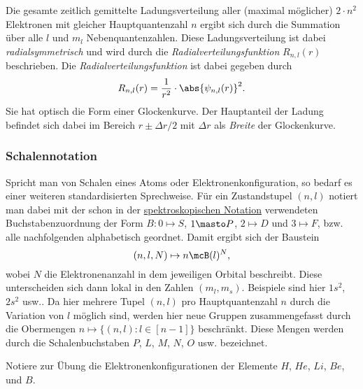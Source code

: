 \documentclass{subfiles}
\begin{document}
        Die gesamte zeitlich gemittelte Ladungsverteilung aller (maximal möglicher) $2\cdot n^2$ Elektronen mit gleicher Hauptquantenzahl $n$ ergibt sich durch die Summation über alle $l$ und $m_l$ Nebenquantenzahlen. Diese Ladungsverteilung ist dabei \emph{radialsymmetrisch} und wird durch die \emph{Radialverteilungsfunktion} $R_{n,l}(r)$ beschrieben. Die \emph{Radialverteilungsfunktion} ist dabei gegeben durch
        \[
            R_{n,l}(r) = \frac{1}{r^2}\cdot\abs{\psi_{n,l}(r)}^2.
        \]
        Sie hat optisch die Form einer Glockenkurve. Der Hauptanteil der Ladung befindet sich dabei im Bereich $r\pm \Delta r/2$ mit $\Delta r$ als \emph{Breite} der Glockenkurve. 

        \subsubsection*{Schalennotation}\label{not:SchalenNot}
            Spricht man von Schalen eines Atoms oder Elektronenkonfiguration, so bedarf es einer weiteren standardisierten Sprechweise. Für ein Zustandstupel $(n,l)$ notiert man dabei mit der schon in der \hyperref[not:SpektNot]{spektroskopischen Notation} verwendeten Buchstabenzuordnung der Form $B:0\mapsto S$, $1\masto P$, $2\mapsto D$ und $3\mapsto F$, bzw. alle nachfolgenden alphabetisch geordnet. Damit ergibt sich der Baustein
            \[
                (n,l,N)\mapsto n\mcB(l)^N,
            \]
            wobei $N$ die Elektronenanzahl in dem jeweiligen Orbital beschreibt. Diese unterscheiden sich dann lokal in den Zahlen $(m_l,m_s)$. Beispiele sind hier $1s^2$, $2s^2$ usw.. Da hier mehrere Tupel $(n,l)$ pro Hauptquantenzahl $n$ durch die Variation von $l$ möglich sind, werden hier neue Gruppen zusammengefasst durch die Obermengen $n\mapsto\{(n,l):l\in[n-1]\}$ beschränkt. Diese Mengen werden durch die Schalenbuchstaben $P$, $L$, $M$, $N$, $O$ usw. bezeichnet. 
            \begin{Aufgabe}
                \nr{} Notiere zur Übung die Elektronenkonfigurationen der Elemente $H$, $He$, $Li$, $Be$, und $B$.
            \end{Aufgabe}
\end{document}
